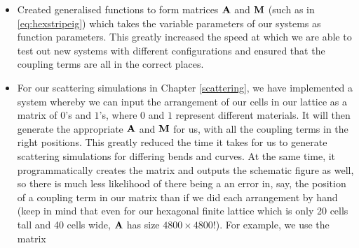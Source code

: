 \begin{itemize}
\item Created generalised functions to form matrices $\mathbf{A}$ and $\mathbf{M}$
(such as in \eqref{eq:hexstripeig}) which takes the variable parameters of our
systems as function parameters. This greatly increased the speed at which we
are able to test out new systems with different configurations and ensured that the coupling terms are all in the correct places. 
\item For our scattering simulations in Chapter \ref{scattering}, we have
implemented a system whereby we can input the arrangement of our cells in our
lattice as a matrix of $0$'s and $1$'s, where $0$ and $1$ represent different
materials. It will then generate the appropriate $\mathbf{A}$ and $\mathbf{M}$ for
us, with all the coupling terms in the right positions. This greatly reduced
the time it takes for us to generate scattering simulations for differing bends
and curves. At the same time, it programmatically creates the matrix and
outputs the schematic figure as well, so there is much less likelihood of there
being a an error in, say, the position of a coupling term in our matrix than if
we did each arrangement by hand (keep in mind that even for our hexagonal
finite lattice which is only 20 cells tall and 40 cells wide, $\mathbf{A}$ has
size $4800\times 4800$!). For example, we use the matrix


\end{itemize}
